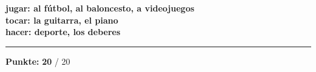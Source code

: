 \documentclass[11pt, a4paper]{article}
\newcommand{\maxpunkte}{20}
\newcommand{\lsg}[1]{\textcolor{loesung}{\textbf{#1}}}
\begin{document}
\lsg{jugar: al fútbol, al baloncesto, a videojuegos}\\
\lsg{tocar: la guitarra, el piano}\\
\lsg{hacer: deporte, los deberes}


\vspace{20pt}
\hrule
\vspace{10pt}

\begin{flushright}
\textbf{Punkte:} \lsg{\maxpunkte} / \maxpunkte
\end{flushright}
\end{document}
